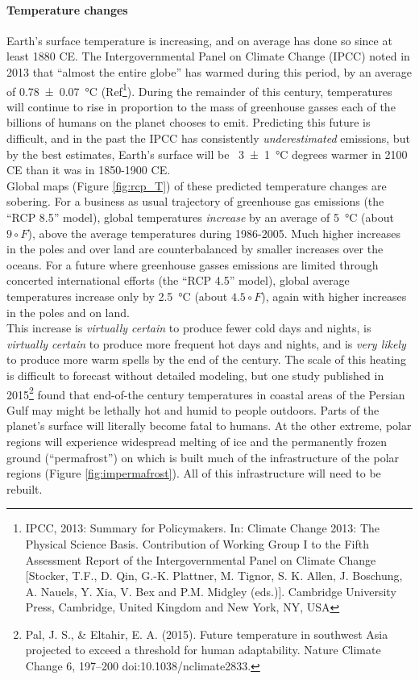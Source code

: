 \documentclass[amstex,12pt]{book}
\begin{document}
\paragraph{Temperature changes}
Earth's surface temperature is increasing, and on average has done so since at least 1880 CE. The Intergovernmental Panel on Climate Change (IPCC) noted in 2013 that ``almost the entire globe'' has warmed during this period, by an average of \SI{0.78(7)}{\degreeCelsius} (Ref\footnote{IPCC, 2013: Summary for Policymakers. In: Climate Change 2013: The Physical Science Basis. Contribution of
Working Group I to the Fifth Assessment Report of the Intergovernmental Panel on Climate Change [Stocker,
T.F., D. Qin, G.-K. Plattner, M. Tignor, S. K. Allen, J. Boschung, A. Nauels, Y. Xia, V. Bex and P.M. Midgley (eds.)]. Cambridge University Press, Cambridge, United Kingdom and New York, NY, USA}). During the remainder of this century, temperatures will continue to rise in proportion to the mass of greenhouse gasses each of the billions of humans on the planet chooses to emit. Predicting this future is difficult, and in the past the IPCC has consistently \emph{underestimated} emissions, but by the best estimates, Earth's surface will be ~\SI{3(1)}{\degreeCelsius} degrees warmer in 2100 CE than it was in 1850-1900 CE. \\

Global maps (Figure \ref{fig:rcp_T}) of these predicted temperature changes are sobering. For a business as usual trajectory of greenhouse gas emissions (the ``RCP 8.5'' model), global temperatures \emph{increase} by an average of \SI{5}{\degreeCelsius} (about $9 \circ F$), above the average temperatures during 1986-2005. Much higher increases in the poles and over land are counterbalanced by smaller increases over the oceans. For a future where greenhouse gasses emissions are limited through concerted international efforts (the ``RCP 4.5'' model), global average temperatures increase only by \SI{2.5}{\degreeCelsius} (about $4.5 \circ F$), again with higher increases in the poles and on land.\\ 

This increase is \emph{virtually certain} to produce fewer cold days and nights, is \emph{virtually certain} to produce more frequent hot days and nights, and is \emph{very likely} to produce more warm spells by the end of the century. The scale of this heating is difficult to forecast without detailed modeling, but one study published in 2015\footnote{Pal, J. S., \& Eltahir, E. A. (2015). Future temperature in southwest Asia projected to exceed a threshold for human adaptability. Nature Climate Change 6, 197–200 doi:10.1038/nclimate2833.} found that end-of-the century temperatures in coastal areas of the Persian Gulf may might be lethally hot and humid to people outdoors. Parts of the planet's surface will literally become fatal to humans. At the other extreme, polar regions will experience widespread melting of ice and the permanently frozen ground (``permafrost'') on which is built much of the infrastructure of the polar regions (Figure \ref{fig:impermafrost}). All of this infrastructure will need to be rebuilt. 
 
\end{document}
